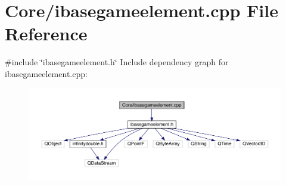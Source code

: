 \hypertarget{a00044}{}\section{Core/ibasegameelement.cpp File Reference}
\label{a00044}
{\ttfamily \#include \char`\"{}ibasegameelement.\+h\char`\"{}}\newline
Include dependency graph for ibasegameelement.\+cpp\+:
\nopagebreak
\begin{figure}[H]
\begin{center}
\leavevmode
\includegraphics[width=350pt]{d6/d97/a00045}
\end{center}
\end{figure}
